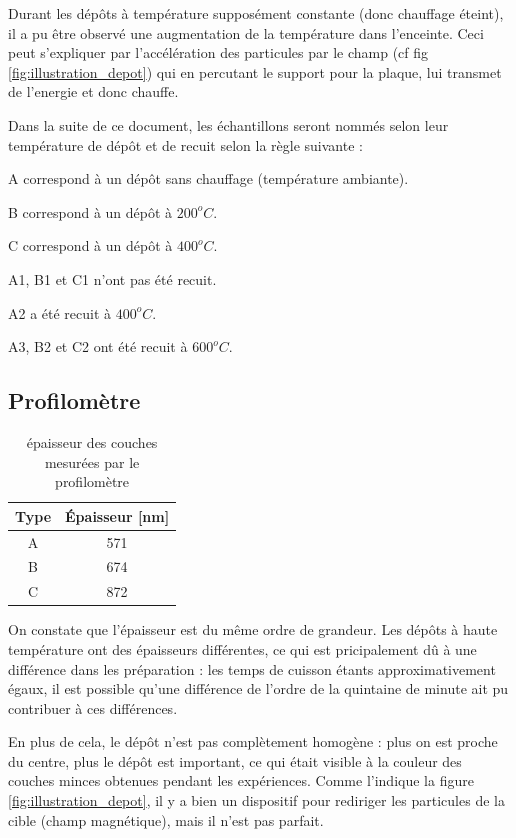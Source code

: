 \documentclass[a4paper,12pt,oneside]{article}
\begin{document}
Durant les dépôts à température supposément constante (donc chauffage éteint), il a pu être observé une augmentation de la température dans l'enceinte. Ceci peut s'expliquer par l'accélération des particules par le champ (cf fig \ref{fig:illustration_depot}) qui en percutant le support pour la plaque, lui transmet de l'energie et donc chauffe.

Dans la suite de ce document, les échantillons seront nommés selon leur température de dépôt et de recuit selon la règle suivante :

A correspond à un dépôt sans chauffage (température ambiante).

B correspond à un dépôt à $200^oC$.

C correspond à un dépôt à $400^oC$.

A1, B1 et C1 n'ont pas été recuit.

A2 a été recuit à $400^oC$.

A3, B2 et C2 ont été recuit à $600^oC$.

\subsection{Profilomètre}

\begin{table}[ht]
\centering
   \begin{tabular}{|c|c|}
	  \hline
	  Type & Épaisseur [nm]\\
	  \hline
	  A & 571 \\
	  B & 674 \\
	  C & 872 \\
	  \hline
   \end{tabular}
   \caption{épaisseur des couches mesurées par le profilomètre}\label{tab:profil}
\end{table}
On constate que l'épaisseur est du même ordre de grandeur. Les dépôts à haute température ont des épaisseurs différentes, ce qui est pricipalement dû à une différence dans les préparation : les temps de cuisson étants approximativement égaux, il est possible qu'une différence de l'ordre de la quintaine de minute ait pu contribuer à ces différences.

En plus de cela, le dépôt n'est pas complètement homogène : plus on est proche du centre, plus le dépôt est important, ce qui était visible à la couleur des couches minces obtenues pendant les expériences. Comme l'indique la figure \ref{fig:illustration_depot}, il y a bien un dispositif pour rediriger les particules de la cible (champ magnétique), mais il n'est pas parfait.
\end{document}
